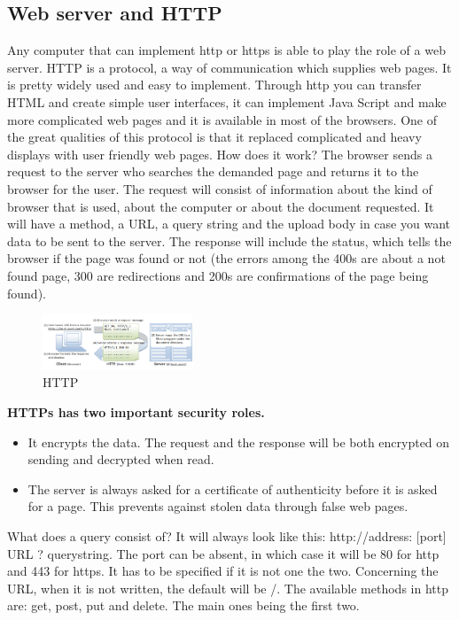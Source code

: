 \subsection{Web server and HTTP}
Any computer that can implement http or https is able to play the role of a web server. HTTP is a protocol, a way of communication which supplies web pages. It is pretty widely used and easy to implement. Through http you can transfer HTML and create simple user interfaces, it can implement Java Script and make more complicated web pages and it is available in most of the browsers. One of the great qualities of this protocol is that it replaced complicated and heavy displays with user friendly web pages.  
How does it work? The browser sends a request to the server who searches the demanded page and returns it to the browser for the user. The request will consist of information about the kind of browser that is used, about the computer or about the document requested. It will have a method, a URL, a query string and the upload body in case you want data to be sent to the server.  
The response will include the status, which tells the browser if the page was found or not (the errors among the 400s are about a not found page, 300 are redirections and 200s are confirmations of the page being found). 

\begin{figure}[ht]
    \centering
    \includegraphics[width=0.4\textwidth]{figures/HTTP.png}
    \caption{HTTP}
\end{figure}

\textbf{HTTPs has two important security roles. }
\begin{itemize}
\item It encrypts the data. The request and the response will be both encrypted on sending and decrypted when read. 
\item The server is always asked for a certificate of authenticity before it is asked for a page. This prevents against stolen data through false web pages.  
\end{itemize}

What does a query consist of? It will always look like this: http://address: [port] URL ? querystring. The port can be absent, in which case it will be 80 for http and 443 for https. It has to be specified if it is not one the two. Concerning the URL, when it is not written, the default will be /. The available methods in http are: get, post, put and delete. The main ones being the first two.  

